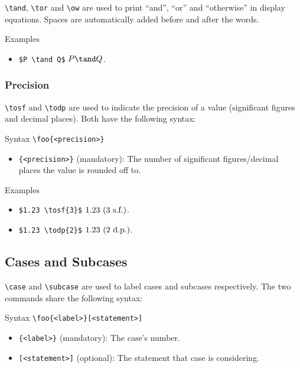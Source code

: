 \verb|\tand|, \verb|\tor| and \verb|\ow| are used to print ``and'', ``or'' and ``otherwise'' in display equations. Spaces are automatically added before and after the words.

\begin{myframe}{Examples}
    \begin{itemize}
        \item \verb|$P \tand Q$| \produces{} $P \tand Q$. 
    \end{itemize}
\end{myframe}

\subsubsection{Precision}

\verb|\tosf| and \verb|\todp| are used to indicate the precision of a value (significant figures and decimal places). Both have the following syntax:

\begin{myframe}{Syntax}
    \verb|\foo{<precision>}|
    \begin{itemize}
        \item \verb|{<precision>}| (mandatory): The number of significant figures/decimal places the value is rounded off to.
    \end{itemize}
\end{myframe}

\begin{myframe}{Examples}
    \begin{itemize}
        \item \verb|$1.23 \tosf{3}$| \produces{} $1.23 \text{ ($3$ s.f.)}$.
        \item \verb|$1.23 \todp{2}$| \produces{} $1.23 \text{ ($2$ d.p.)}$.
    \end{itemize}
\end{myframe}

\subsection{Cases and Subcases}

\verb|\case| and \verb|\subcase| are used to label cases and subcases respectively. The two commands share the following syntax:

\begin{myframe}{Syntax}
    \verb|\foo{<label>}[<statement>]|
    \begin{itemize}
        \item \verb|{<label>}| (mandatory): The case's number.
        \item \verb|[<statement>]| (optional): The statement that case is considering.
    \end{itemize}
\end{myframe}

